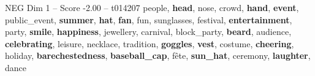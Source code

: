 \begin{textsample}{NEG Dim 1 – Score -2.00 – t014207}  \label{ex:f1_neg_001}
people, \textbf{head}, nose, crowd, \textbf{hand}, \textbf{event}, public\_event, \textbf{summer}, \textbf{hat}, \textbf{fan}, fun, sunglasses, festival, \textbf{entertainment}, party, \textbf{smile}, \textbf{happiness}, jewellery, carnival, block\_party, \textbf{beard}, audience, \textbf{celebrating}, leisure, necklace, tradition, \textbf{goggles}, \textbf{vest}, costume, \textbf{cheering}, holiday, \textbf{barechestedness}, \textbf{baseball\_cap}, fête, \textbf{sun\_hat}, ceremony, \textbf{laughter}, dance

\end{textsample}
